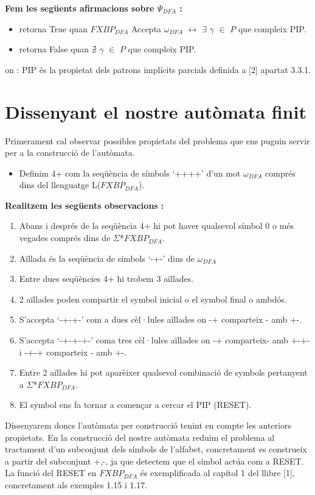 \documentclass[12pt,a4paper]{report}
\def \dfa{$FXBP_{DFA} $}
\def \alphabetDFA{$\Sigma$*\dfa}
\def \wdfa{$\omega_{DFA} $}
\def \postDFA{$\Psi_{DFA}$}
\def \llesca{$\gamma$}
\begin{document}
\textbf{Fem les següents afirmacions sobre \postDFA{} :}
\begin{itemize}
\item retorna True quan \dfa{} Accepta \wdfa{} $\leftrightarrow$ $\exists$ \llesca{} $\in$ $P$ que compleix PIP.
\item retorna False quan $\nexists$ \llesca{} $\in$ $P$ que compleix PIP.
\end{itemize}
on : PIP és la propietat dels patrons implícits parcials definida a [2] apartat 3.3.1.

\section{Dissenyant el nostre autòmata finit}

Primerament cal observar possibles propietats del problema que ens puguin servir per a la construcció de l’autòmata.

\begin{itemize}
\item Definim 4+ com la seqüència de símbols ‘++++’ d’un mot \wdfa{} comprés dins del llenguatge L(\dfa{}).
\end{itemize}

\textbf{Realitzem les següents observacions :}

\begin{enumerate}
\item Abans i després de la seqüència 4+ hi pot haver qualsevol símbol 0 o més vegades comprés dins de \alphabetDFA{}.
\item Aïllada és la seqüència de simbols ‘-+-’ dins de \wdfa{}
\item Entre dues seqüències 4+ hi trobem 3 aïllades.
\item 2 aïllades poden compartir el symbol inicial o el symbol final o ambdós.
\item S’accepta ‘-+-+-’ com a dues cèl·lules aïllades on -+ comparteix - amb +-.
\item S’accepta ‘-+-+-+-’ coma  tres cèl·lules aïllades on -+ comparteix- amb +-+- i -+-+ comparteix - amb +-.
\item Entre 2 aïllades hi pot aparèixer qualsevol combinació de symbols pertanyent a \alphabetDFA{}.
\item El symbol \Return ens fa tornar a començar a cercar el PIP (RESET).
\end{enumerate}


Dissenyarem doncs l’autòmata per construcció tenint en compte les anteriors propietats. En la construcció del nostre autòmata reduim el problema al tractament d’un subconjunt dels símbols de l’alfabet, concretament es construeix a partir del subconjunt {+,-}, ja que detectem que el símbol \Return actúa com a RESET. La funció del RESET en \dfa{} és exemplificada al capítol 1 del llibre [1], concretament als exemples 1.15 i 1.17.
\end{document}
